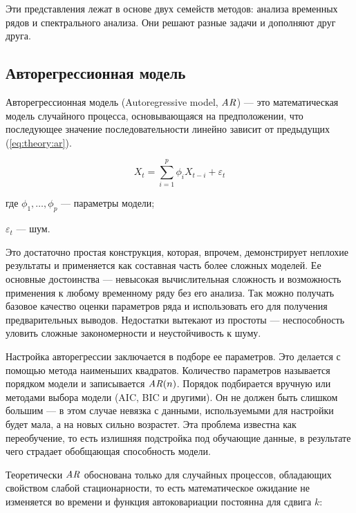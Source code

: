 Эти представления лежат в основе двух семейств методов: анализа временных рядов и спектрального анализа. Они решают разные задачи и дополняют друг друга.


\subsection{Авторегрессионная модель}

Авторегрессионная модель (Autoregressive model, $\mathit{AR}$) --- это математическая модель случайного процесса, основывающаяся на предположении, что последующее значение последовательности линейно зависит от предыдущих (\autoref{eq:theory:ar}).

\begin{equation}
  \label{eq:theory:ar}
  X_t = \sum_{i=1}^p \phi_i X_{t-i} + \varepsilon_t
\end{equation}
\begin{explanation}
\item[где] $\phi_1, \dotsc, \phi_p$ --- параметры модели;
\item $\varepsilon_t$ --- шум.
\end{explanation}

Это достаточно простая конструкция, которая, впрочем, демонстрирует неплохие результаты и применяется как составная часть более сложных моделей.
Ее основные достоинства --- невысокая вычислительная сложность и возможность применения к любому временному ряду без его анализа. Так можно получать базовое качество оценки параметров ряда и использовать его для получения предварительных выводов.
Недостатки вытекают из простоты --- неспособность уловить сложные закономерности и неустойчивость к шуму.


Настройка авторегрессии заключается в подборе ее параметров. Это делается с помощью метода наименьших квадратов. Количество параметров называется порядком модели и записывается $\mathit{\mathit{AR}}(n)$. Порядок подбирается вручную или методами выбора модели (AIC, BIC и другими). Он не должен быть слишком большим --- в этом случае невязка с данными, используемыми для настройки будет мала, а на новых сильно возрастет. Эта проблема известна как переобучение, то есть излишняя подстройка под обучающие данные, в результате чего страдает обобщающая способность модели.

Теоретически $\mathit{AR}$ обоснована только для случайных процессов, обладающих свойством слабой стационарности, то есть математическое ожидание не изменяется во времени и функция автоковариации постоянна для сдвига $k$:

